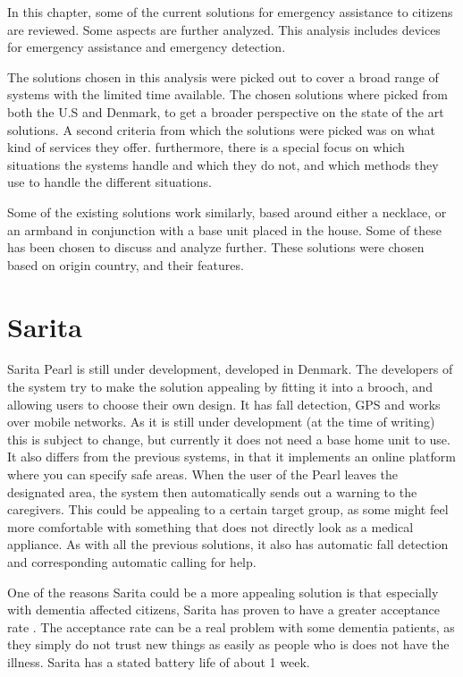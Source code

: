 \label{sec:existing_solutions}
In this chapter, some of the current solutions for emergency assistance to citizens are reviewed. Some aspects are further analyzed. This analysis includes devices for emergency assistance and emergency detection.

The solutions chosen in this analysis were picked out to cover a broad range of systems with the limited time available. The chosen solutions where picked from both the U.S and Denmark, to get a broader perspective on the state of the art solutions.
A second criteria from which the solutions were picked was on what kind of services they offer. furthermore, there is a special focus on which situations the systems handle and which they do not, and which methods they use to handle the different situations.

Some of the existing solutions work similarly, based around either a necklace, or an armband in conjunction with a base unit placed in the house. Some of these has been chosen to discuss and analyze further. These solutions were chosen based on origin country, and their features. 

\section{Sarita}
Sarita Pearl \cite{sarita} is still under development, developed in Denmark. The developers of the system try to make the solution appealing by fitting it into a brooch, and allowing users to choose their own design. It has fall detection, GPS and works over mobile networks. As it is still under development (at the time of writing) this is subject to change, but currently it does not need a base home unit to use. It also differs from the previous systems, in that it implements an online platform where you can specify safe areas. When the user of the Pearl leaves the designated area, the system then automatically sends out a warning to the caregivers. This could be appealing to a certain target group, as some might feel more comfortable with something that does not directly look as a medical appliance. As with all the previous solutions, it also has automatic fall detection and corresponding automatic calling for help. 

One of the reasons Sarita could be a more appealing solution is that especially with dementia affected citizens, Sarita has proven to have a greater acceptance rate \cite{saritaacceptance}. The acceptance rate can be a real problem with some dementia patients, as they simply do not trust new things as easily as people who is does not have the illness. Sarita has a stated battery life of about 1 week. 

